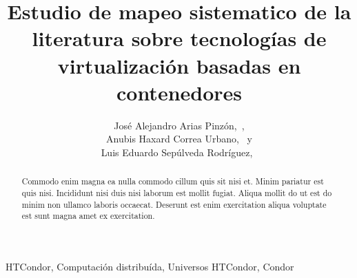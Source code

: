 \documentclass[]{IEEEtran}
\begin{document}
\renewcommand{\thesection}{\arabic{section}}
\renewcommand{\thesubsection}{\thesection.\arabic{subsection}}
\renewcommand{\thesubsubsection}{\thesubsection.\arabic{subsubsection}}

\title{
    Estudio de mapeo sistematico de la literatura sobre tecnologías de virtualización basadas en contenedores
}

\author{
    José Alejandro Arias Pinzón,~, \\
    Anubis Haxard Correa Urbano,~ y \\
    Luis Eduardo Sepúlveda Rodríguez,~
}



\maketitle

\begin{abstract}
Commodo enim magna ea nulla commodo cillum quis sit nisi et. Minim pariatur est quis nisi. Incididunt nisi duis nisi laborum est mollit fugiat. Aliqua mollit do ut est do minim non ullamco laboris occaecat. Deserunt est enim exercitation aliqua voluptate est sunt magna amet ex exercitation.
\end{abstract}


\begin{IEEEkeywords}
HTCondor, Computación distribuída, Universos HTCondor, Condor
\end{IEEEkeywords}

















%




\end{document}

